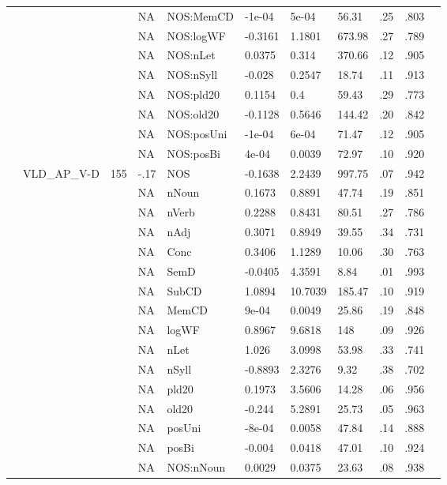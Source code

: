 \begin{table}[ht]
\begin{tabular}{lllllllllll}
   &  &  & NA & NOS:MemCD & -1e-04 & 5e-04 & 56.31 & .25 & .803 &   \\ 
   &  &  & NA & NOS:logWF & -0.3161 & 1.1801 & 673.98 & .27 & .789 &   \\ 
   &  &  & NA & NOS:nLet & 0.0375 & 0.314 & 370.66 & .12 & .905 &   \\ 
   &  &  & NA & NOS:nSyll & -0.028 & 0.2547 & 18.74 & .11 & .913 &   \\ 
   &  &  & NA & NOS:pld20 & 0.1154 & 0.4 & 59.43 & .29 & .773 &   \\ 
   &  &  & NA & NOS:old20 & -0.1128 & 0.5646 & 144.42 & .20 & .842 &   \\ 
   &  &  & NA & NOS:posUni & -1e-04 & 6e-04 & 71.47 & .12 & .905 &   \\ 
   &  &  & NA & NOS:posBi & 4e-04 & 0.0039 & 72.97 & .10 & .920 &   \\ 
   & VLD\_AP\_V-D & 155 & -.17 & NOS & -0.1638 & 2.2439 & 997.75 & .07 & .942 &   \\ 
   &  &  & NA & nNoun & 0.1673 & 0.8891 & 47.74 & .19 & .851 &   \\ 
   &  &  & NA & nVerb & 0.2288 & 0.8431 & 80.51 & .27 & .786 &   \\ 
   &  &  & NA & nAdj & 0.3071 & 0.8949 & 39.55 & .34 & .731 &   \\ 
   &  &  & NA & Conc & 0.3406 & 1.1289 & 10.06 & .30 & .763 &   \\ 
   &  &  & NA & SemD & -0.0405 & 4.3591 & 8.84 & .01 & .993 &   \\ 
   &  &  & NA & SubCD & 1.0894 & 10.7039 & 185.47 & .10 & .919 &   \\ 
   &  &  & NA & MemCD & 9e-04 & 0.0049 & 25.86 & .19 & .848 &   \\ 
   &  &  & NA & logWF & 0.8967 & 9.6818 & 148 & .09 & .926 &   \\ 
   &  &  & NA & nLet & 1.026 & 3.0998 & 53.98 & .33 & .741 &   \\ 
   &  &  & NA & nSyll & -0.8893 & 2.3276 & 9.32 & .38 & .702 &   \\ 
   &  &  & NA & pld20 & 0.1973 & 3.5606 & 14.28 & .06 & .956 &   \\ 
   &  &  & NA & old20 & -0.244 & 5.2891 & 25.73 & .05 & .963 &   \\ 
   &  &  & NA & posUni & -8e-04 & 0.0058 & 47.84 & .14 & .888 &   \\ 
   &  &  & NA & posBi & -0.004 & 0.0418 & 47.01 & .10 & .924 &   \\ 
   &  &  & NA & NOS:nNoun & 0.0029 & 0.0375 & 23.63 & .08 & .938 &   \\ 

\end{tabular}
\end{table}
